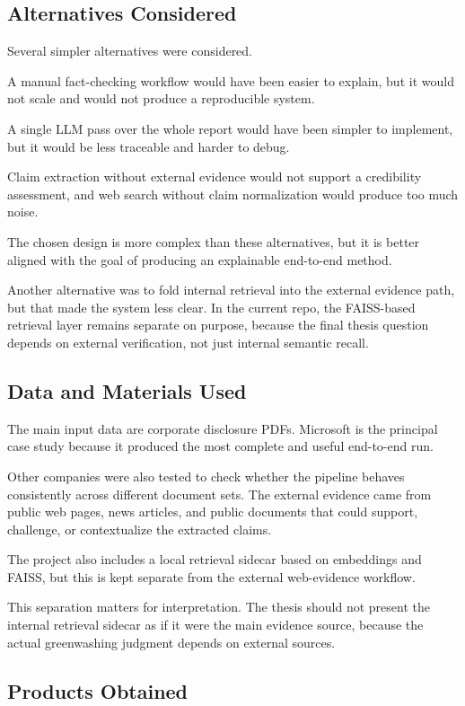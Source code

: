 \subsection{Alternatives Considered}

Several simpler alternatives were considered.

A manual fact-checking workflow would have been easier to explain, but it would not scale and would not produce a reproducible system.

A single LLM pass over the whole report would have been simpler to implement, but it would be less traceable and harder to debug.

Claim extraction without external evidence would not support a credibility assessment, and web search without claim normalization would produce too much noise.

The chosen design is more complex than these alternatives, but it is better aligned with the goal of producing an explainable end-to-end method.

Another alternative was to fold internal retrieval into the external evidence path, but that made the system less clear. In the current repo, the FAISS-based retrieval layer remains separate on purpose, because the final thesis question depends on external verification, not just internal semantic recall.

\subsection{Data and Materials Used}

The main input data are corporate disclosure PDFs. Microsoft is the principal case study because it produced the most complete and useful end-to-end run.

Other companies were also tested to check whether the pipeline behaves consistently across different document sets. The external evidence came from public web pages, news articles, and public documents that could support, challenge, or contextualize the extracted claims.

The project also includes a local retrieval sidecar based on embeddings and FAISS, but this is kept separate from the external web-evidence workflow.

This separation matters for interpretation. The thesis should not present the internal retrieval sidecar as if it were the main evidence source, because the actual greenwashing judgment depends on external sources.

\subsection{Products Obtained}

